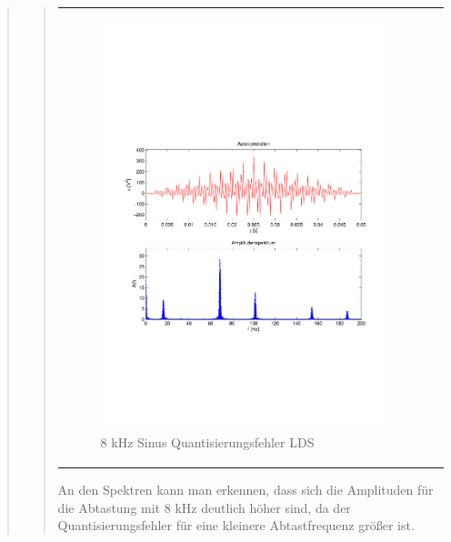 \begin{quote}
\begin{quote}
\begin{center}
\begin{tabular}{ll}
                \begin{minipage}{0.6\textwidth}
                    \begin{figure}[H]
                        \includegraphics[scale=0.5, trim = 16mm 70mm 16mm 85mm, clip]
                                        {Bilder/8kHz_sin_LSD}
                        \caption{8 kHz Sinus Quantisierungsfehler LDS}
                        \label{fig:8kHz_sin_LDS}
                    \end{figure}
                \end{minipage}
            
            \end{tabular}
        \end{center}
        \vspace{2em}
        
        An den Spektren kann man erkennen, dass sich die Amplituden für die Abtastung mit 8 kHz deutlich höher sind, da
        der Quantisierungsfehler für eine kleinere Abtastfrequenz größer ist.
        
    \end{quote}
    
\end{quote}


